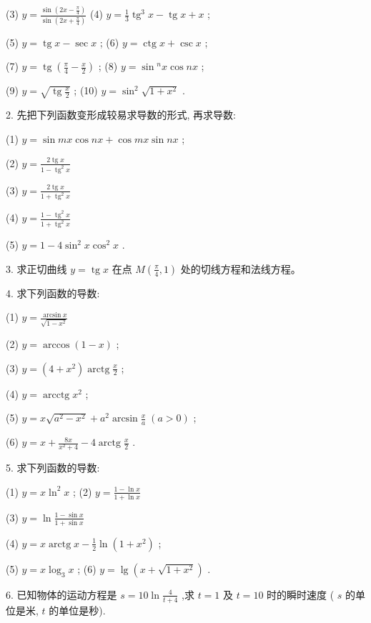\documentclass[10pt]{article}
\begin{document}
(3) \(y = \frac{\sin \left( {{2x} - \frac{\pi }{4}}\right) }{\sin \left( {{2x} + \frac{\pi }{4}}\right) }\) (4) \(y = \frac{1}{3}{\operatorname{tg}}^{3}x - \operatorname{tg}x + x\) ;

(5) \(y = \operatorname{tg}x - \sec x\) ; (6) \(y = \operatorname{ctg}x + \csc x\) ;

(7) \(y = \operatorname{tg}\left( {\frac{\pi }{4} - \frac{x}{2}}\right)\) ; (8) \(y = \sin {}^{n}x\cos {nx}\) ;

(9) \(y = \sqrt{\operatorname{tg}\frac{x}{2}}\) ; (10) \(y = {\sin }^{2}\sqrt{1 + {x}^{2}}\) .

2. 先把下列函数变形成较易求导数的形式, 再求导数:

(1) \(y = \sin {mx}\cos {nx} + \cos {mx}\sin {nx}\) ;

(2) \(y = \frac{2\operatorname{tg}x}{1 - {\operatorname{tg}}^{2}x}\)

(3) \(y = \frac{2\operatorname{tg}x}{1 + {\operatorname{tg}}^{2}x}\)

(4) \(y = \frac{1 - {\operatorname{tg}}^{2}x}{1 + {\operatorname{tg}}^{2}x}\)

(5) \(y = 1 - 4{\sin }^{2}x{\cos }^{2}x\) .

3. 求正切曲线 \(y = \operatorname{tg}x\) 在点 \(M\left( {\frac{\pi }{4},1}\right)\) 处的切线方程和法线方程。

4. 求下列函数的导数:

(1) \(y = \frac{\arcsin x}{\sqrt{1 - {x}^{2}}}\)

(2) \(y = \arccos \left( {1 - x}\right)\) ;

(3) \(y = \left( {4 + {x}^{2}}\right) \operatorname{arctg}\frac{x}{2}\) ;

(4) \(y = \operatorname{arcctg}{x}^{2}\) ;

(5) \(y = x\sqrt{{a}^{2} - {x}^{2}} + {a}^{2}\arcsin \frac{x}{a}\;\left( {a > 0}\right)\) ;

(6) \(y = x + \frac{8x}{{x}^{2} + 4} - 4\operatorname{arctg}\frac{x}{2}\) .

5. 求下列函数的导数:

(1) \(y = x{\ln }^{2}x\) ; (2) \(y = \frac{1 - \ln x}{1 + \ln x}\)

(3) \(y = \ln \frac{1 - \sin x}{1 + \sin x}\)

(4) \(y = x\operatorname{arctg}x - \frac{1}{2}\ln \left( {1 + {x}^{2}}\right)\) ;

(5) \(y = x{\log }_{3}x\) ; (6) \(y = \lg \left( {x + \sqrt{1 + {x}^{2}}}\right)\) .

6. 已知物体的运动方程是 \(s = {10}\ln \frac{4}{t + 4}\) ,求 \(t = 1\) 及 \(t = {10}\) 时的瞬时速度 ( \(s\) 的单位是米, \(t\) 的单位是秒).
\end{document}
